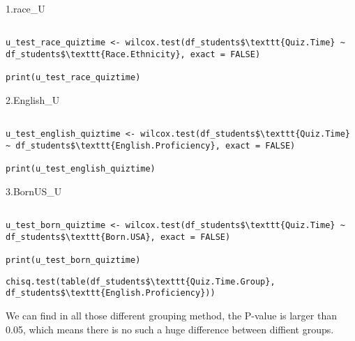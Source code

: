 1.race_U
\begin{verbatim}

u_test_race_quiztime <- wilcox.test(df_students$\texttt{Quiz.Time} ~ df_students$\texttt{Race.Ethnicity}, exact = FALSE)

print(u_test_race_quiztime)

\end{verbatim}
2.English_U
\begin{verbatim}

u_test_english_quiztime <- wilcox.test(df_students$\texttt{Quiz.Time} ~ df_students$\texttt{English.Proficiency}, exact = FALSE)

print(u_test_english_quiztime)

\end{verbatim}
3.BornUS_U
\begin{verbatim}

u_test_born_quiztime <- wilcox.test(df_students$\texttt{Quiz.Time} ~ df_students$\texttt{Born.USA}, exact = FALSE)

print(u_test_born_quiztime)

\end{verbatim}

\begin{verbatim}
chisq.test(table(df_students$\texttt{Quiz.Time.Group}, df_students$\texttt{English.Proficiency}))
\end{verbatim}


We can find in all those different grouping method, the P-value is larger than 0.05, which means  there is no such a huge difference between diffient groups.
